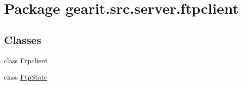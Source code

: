 \hypertarget{namespacegearit_1_1src_1_1server_1_1ftpclient}{\section{Package gearit.\+src.\+server.\+ftpclient}
\label{namespacegearit_1_1src_1_1server_1_1ftpclient}
}
\subsection*{Classes}
\begin{DoxyCompactItemize}
\item 
class \hyperlink{classgearit_1_1src_1_1server_1_1ftpclient_1_1_ftpclient}{Ftpclient}
\item 
class \hyperlink{classgearit_1_1src_1_1server_1_1ftpclient_1_1_ftp_state}{Ftp\+State}
\end{DoxyCompactItemize}
